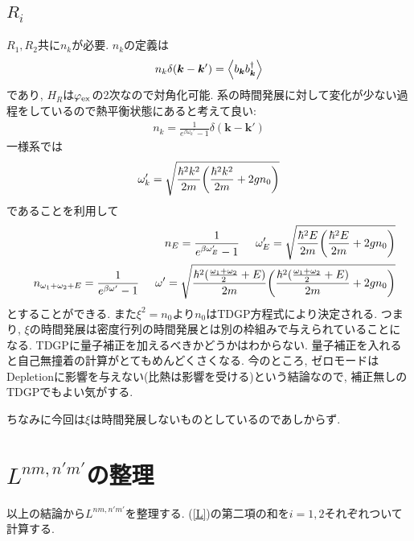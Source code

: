 \documentclass[10.5pt,a4paper]{jreport}
\begin{document}
\subsection{$R_i$}
$R_1, R_2$共に$n_k$が必要. $n_k$の定義は
\begin{eqnarray}
  n_k\delta(\bm{k} - \bm{k}') = \ev{b_{\bm{k}}b_{\bm{k}}^\dagger}
\end{eqnarray}
であり, $H_R$は$\varphi_{\rm ex}$の2次なので対角化可能. 系の時間発展に対して変化が少ない過程をしているので熱平衡状態にあると考えて良い:
\begin{eqnarray}
  n_k = \frac{1}{e^{\beta\omega_k'}-1}\delta(\bm{k} - \bm{k}')
\end{eqnarray}
一様系では
\begin{eqnarray}
  \omega_k' = \sqrt{\frac{\hbar^2k^2}{2m}\pqty{\frac{\hbar^2k^2}{2m} + 2gn_0}}
\end{eqnarray}
であることを利用して
\begin{eqnarray}
 && n_E = \frac{1}{e^{\beta\omega_E'}-1}\hspace{0.5cm}\omega_E' = \sqrt{\frac{\hbar^2E}{2m}\pqty{\frac{\hbar^2E}{2m} + 2gn_0}}\\
  &&n_{\omega_1 + \omega_2 + E} = \frac{1}{e^{\beta\omega'}-1}\hspace{0.5cm}\omega' = \sqrt{\frac{\hbar^2(\frac{\omega_1 + \omega_2}{2}+E)}{2m}\pqty{\frac{\hbar^2(\frac{\omega_1 + \omega_2}{2}+E)}{2m} + 2gn_0}}
\end{eqnarray}
とすることができる. また$\xi^2 = n_0$より$n_0$はTDGP方程式により決定される. つまり, $\xi$の時間発展は密度行列の時間発展とは別の枠組みで与えられていることになる. TDGPに量子補正を加えるべきかどうかはわからない. 量子補正を入れると自己無撞着の計算がとてもめんどくさくなる. 今のところ, ゼロモードはDepletionに影響を与えない(比熱は影響を受ける)という結論なので, 補正無しのTDGPでもよい気がする.

ちなみに今回は$\xi$は時間発展しないものとしているのであしからず. 
\section{$L^{nm,n'm'}$の整理}
以上の結論から$L^{nm,n'm'}$を整理する. (\ref{L})の第二項の和を$i = 1, 2$それぞれついて計算する.
\end{document}
